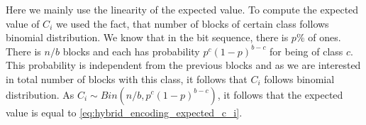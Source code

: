 Here we mainly use the linearity of the expected value. To compute the expected value of
$C_i$ we used the fact, that number of blocks of certain class follows binomial
distribution. We know that in the bit sequence, there is $p\%$ of ones. There is $n/b$ blocks
and each has probability $p^c(1-p)^{b-c}$ for being of class $c$. This probability is independent
from the previous blocks and as we are interested in total number of blocks with this class,
it follows that $C_i$ follows binomial distribution. As $C_i \sim Bin(n/b, p^c(1-p)^{b-c})$,
it follows that the expected value is equal to \ref{eq:hybrid_encoding_expected_c_i}.

